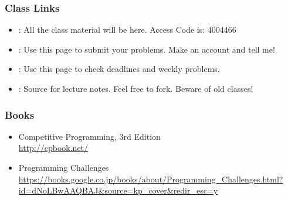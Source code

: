 \documentclass{beamer}
\begin{document}
\begin{frame}
  \frametitle{Class Links}
  \begin{itemize} 
  \item \href{https://manaba.tsukuba.ac.jp/ct/course_455573}{}: 
    All the class material will be here. Access Code is: 4004466

    \medskip

  \item \href{https://uva.onlinejudge.org/}{}:
    Use this page to submit your problems. \alert{Make an account and tell me!}

    \medskip

  \item \href{https://conclave.cs.tsukuba.ac.jp/lecture/monitor.html}{}:
    Use this page to check deadlines and weekly problems.

    \medskip

  \item
    \href{https://www.github.com/caranha/ProgrammingChallengesLectureNotes}{}:
    Source for lecture notes. Feel free to fork. Beware of old classes!        
  \end{itemize}
\end{frame}


\begin{frame}
  \frametitle{Books}

  \begin{itemize}
  \item {} Competitive Programming, 3rd Edition\\
    \url{http://cpbook.net/}\\
    
    \bigskip

  \item {} Programming Challenges\\
    \url{https://books.google.co.jp/books/about/Programming_Challenges.html?id=dNoLBwAAQBAJ&source=kp_cover&redir_esc=y}
  \end{itemize}
\end{frame}
\end{document}
